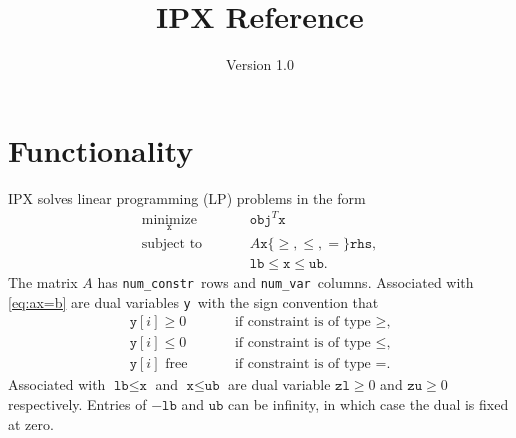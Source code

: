 \documentclass{article}
\title{IPX Reference}
\author{Version 1.0}
\newcommand{\ct}{\texttt}
\newcommand{\obj}{\ct{obj}}
\newcommand{\rhs}{\ct{rhs}}
\newcommand{\lb}{\ct{lb}}
\newcommand{\ub}{\ct{ub}}
\newcommand{\numconstr}{\ct{num\_constr}}
\newcommand{\numvar}{\ct{num\_var}}
\newcommand{\x}{\ct{x}}
\newcommand{\y}{\ct{y}}
\newcommand{\zl}{\ct{zl}}
\newcommand{\zu}{\ct{zu}}
\begin{document}
\maketitle

\section*{Functionality}

IPX solves linear programming (LP) problems in the form
\begin{subequations}
  \begin{alignat}{2}
    \underset{\x}{\text{minimize}} &\quad& &\obj^T\x \\
    \label{eq:ax=b}
    \text{subject to} && &A\x\{\ge,\le,=\}\rhs, \\
    && &\lb\le\x\le\ub.\
  \end{alignat}
\end{subequations}
The matrix $A$ has \numconstr\ rows and \numvar\ columns. Associated with
\eqref{eq:ax=b} are dual variables \y\ with the sign convention that
\begin{subequations}
  \label{eq:signy}
  \begin{alignat}{2}
    \y[i]\ge0 &\quad& &\text{if constraint is of type $\ge$,} \\
    \y[i]\le0 && &\text{if constraint is of type $\le$,} \\
    \y[i]\text{ free} && &\text{if constraint is of type $=$.}
  \end{alignat}
\end{subequations}
Associated with $\lb\le\x$ and $\x\le\ub$ are dual variable $\zl\ge0$ and
$\zu\ge0$ respectively. Entries of $-\lb$ and $\ub$ can be infinity, in which
case the dual is fixed at zero.
\end{document}
